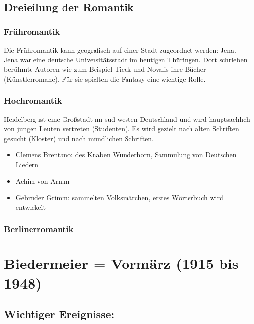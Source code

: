 \documentclass[12pt,a4paper]{article}
\begin{document}
\subsection{Dreieilung der Romantik}

\subsubsection{Frühromantik}

Die Frühromantik kann geografisch auf einer Stadt zugeordnet werden: Jena. Jena war eine deutsche Universitätsstadt im heutigen Thüringen. Dort schrieben berühmte Autoren wie zum Beispiel Tieck und Novalis ihre Bücher (Künstlerromane). Für sie spielten die Fantasy eine wichtige Rolle.

\subsubsection{Hochromantik}

Heidelberg ist eine Großstadt im süd-westen Deutschland und wird hauptsächlich von jungen Leuten vertreten (Studenten). Es wird gezielt nach alten Schriften gesucht (Kloster) und nach mündlichen Schriften.

\begin{itemize}
\item Clemens Brentano: des Knaben Wunderhorn, Sammulung von Deutschen Liedern
\item Achim von Arnim
\item Gebrüder Grimm: sammelten Volksmärchen, erstes Wörterbuch wird entwickelt
\end{itemize}

\subsubsection{Berlinerromantik}

\newpage

\section{Biedermeier = Vormärz (1915 bis 1948)}

\subsection{Wichtiger Ereignisse:}
\end{document}
